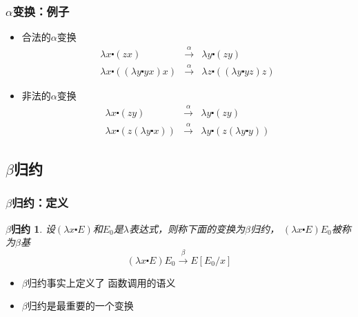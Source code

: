 \documentclass[CJKutf8,compress,hyperref]{beamer}
\begin{document}
\begin{CJK}{UTF8}{song}
\begin{frame}
  \frametitle{$\alpha$变换：例子} 
  \begin{itemize}
  \item 合法的$\alpha$变换 
    \begin{eqnarray*}
      \lambda x \centerdot (zx) & \stackrel{\alpha}{\longrightarrow} & \lambda y \centerdot (zy) \\ 
      \lambda x \centerdot ((\lambda y \centerdot yx) x) & \stackrel{\alpha}{\longrightarrow} & \lambda z  \centerdot ((\lambda y \centerdot yz) z) 
    \end{eqnarray*}
  \item 非法的$\alpha$变换
    \begin{eqnarray*}      
      \lambda x \centerdot (zy) & \stackrel{\alpha}{\longrightarrow} &  \lambda y \centerdot (zy) \\
      \lambda x \centerdot (z (\lambda y \centerdot x))  & \stackrel{\alpha}{\longrightarrow} & \lambda y \centerdot (z (\lambda y \centerdot y)) 
    \end{eqnarray*}
  \end{itemize}
\end{frame} 

\subsection{ $\beta$归约}
\begin{frame}
  \frametitle{$\beta$归约：定义} 
\newtheorem{betaRed}{$\beta$归约}
\begin{betaRed}
  设$(\lambda x \centerdot E)$和$E_0$是$\lambda$表达式，则称下面的变换为{\color{red}$\beta$归约}，  $(\lambda x \centerdot E)E_0$被称为$\beta$基
  \begin{displaymath}
    (\lambda x \centerdot E)E_0 \stackrel{\beta}{\longrightarrow} E[E_0/x] 
  \end{displaymath} 
\end{betaRed}
  \begin{itemize}
  \item $\beta$归约事实上定义了 {\color{red}函数调用}的语义 
  \item $\beta$归约是最重要的一个变换
  \end{itemize}
\end{frame} 


\end{CJK}
\end{document}
